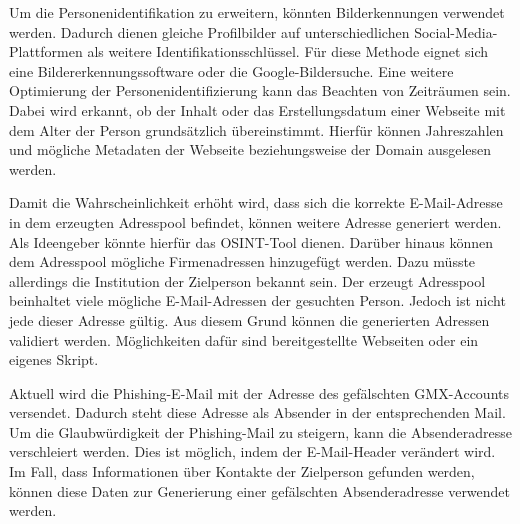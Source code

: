 Um die Personenidentifikation zu erweitern, könnten Bilderkennungen verwendet werden. Dadurch dienen gleiche Profilbilder auf unterschiedlichen Social-Media-Plattformen als weitere Identifikationsschlüssel. Für diese Methode eignet sich eine Bildererkennungssoftware oder die Google-Bildersuche. Eine weitere Optimierung der Personenidentifizierung kann das Beachten von Zeiträumen sein. Dabei wird erkannt, ob der Inhalt oder das Erstellungsdatum einer Webseite mit dem Alter der Person grundsätzlich übereinstimmt. Hierfür können Jahreszahlen und mögliche Metadaten der Webseite beziehungsweise der Domain ausgelesen werden.

Damit die Wahrscheinlichkeit erhöht wird, dass sich die korrekte E-Mail-Adresse in dem erzeugten Adresspool befindet, können weitere Adresse generiert werden. Als Ideengeber könnte hierfür das OSINT-Tool \cite{EmailAssumptions} dienen. Darüber hinaus können dem Adresspool mögliche Firmenadressen hinzugefügt werden. Dazu müsste allerdings die Institution der Zielperson bekannt sein. Der erzeugt Adresspool beinhaltet viele mögliche E-Mail-Adressen der gesuchten Person. Jedoch ist nicht jede dieser Adresse gültig. Aus diesem Grund können die generierten Adressen validiert werden. Möglichkeiten dafür sind bereitgestellte Webseiten oder ein eigenes Skript.

Aktuell wird die Phishing-E-Mail mit der Adresse des gefälschten GMX-Accounts versendet. Dadurch steht diese Adresse als Absender in der entsprechenden Mail. Um die Glaubwürdigkeit der Phishing-Mail zu steigern, kann die Absenderadresse verschleiert werden. Dies ist möglich, indem der E-Mail-Header verändert wird. Im Fall, dass Informationen über Kontakte der Zielperson gefunden werden, können diese Daten zur Generierung einer gefälschten Absenderadresse verwendet werden.

